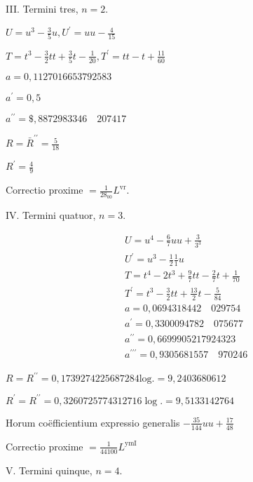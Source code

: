 \documentclass[10pt]{article}
\begin{document}
III. Termini tres, \(n=2\).

\(U=u^{3}-\frac{3}{5} u, U^{\prime}=u u-\frac{4}{15}\)

\(T=t^{3}-\frac{3}{2} t t+\frac{3}{5} t-\frac{1}{20}, T^{\prime}=t t-t+\frac{11}{60}\)

\(a=0,1127016653792583\)

\(a^{\prime}=0,5\)

\(a^{\prime \prime}=\$, 8872983346 \quad 207417\)

\(R=\bar{R}^{\prime \prime}=\frac{5}{18}\)

\(R^{\prime}=\frac{4}{9}\)

Correctio proxime \(=\frac{1}{28_{00}} L^{\mathrm{vr}}\).

IV. Termini quatuor, \(n=3\).

\[
\begin{aligned}
& U=u^{4}-\frac{6}{7} u u+\frac{3}{3^{3}} \\
& U^{\prime}=u^{3}-\frac{1}{2} \frac{1}{1} u \\
& T=t^{4}-2 t^{3}+\frac{9}{7} t t-\frac{2}{7} t+\frac{1}{70} \\
& T^{\prime}=t^{3}-\frac{3}{2} t t+\frac{13}{2} t-\frac{5}{84} \\
& a=0,0694318442 \quad 029754 \\
& a^{\prime}=0,3300094782 \quad 075677 \\
& a^{\prime \prime}=0,6699905217924323 \\
& a^{\prime \prime \prime}=0,9305681557 \quad 970246
\end{aligned}
\]

\(R=R^{\prime \prime}=0,1739274225687284 \mathrm{log} .=9,2403680612\)

\(R^{\prime}=R^{\prime \prime}=0,3260725774312716 \log .=9,5133142764\)

Horum coëfficientium expressio generalis \(-\frac{35}{144} u u+\frac{17}{48}\)

Correctio proxime \(=\frac{1}{44100} L^{\mathrm{ymI}}\)

V. Termini quinque, \(n=4\).
\end{document}
